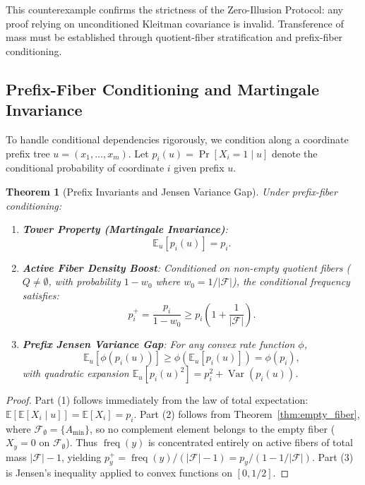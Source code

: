 \documentclass[11pt,a4paper]{article}
\theoremstyle{plain}
\newtheorem{theorem}{Theorem}[section]
\theoremstyle{definition}
\theoremstyle{remark}
\newcommand{\F}{\mathcal{F}}
\newcommand{\freq}{\operatorname{freq}}
\newcommand{\E}{\mathbb{E}}
\newcommand{\Var}{\operatorname{Var}}
\begin{document}
This counterexample confirms the strictness of the Zero-Illusion Protocol: any proof relying on unconditioned Kleitman covariance is invalid. Transference of mass must be established through quotient-fiber stratification and prefix-fiber conditioning.

\subsection{Prefix-Fiber Conditioning and Martingale Invariance}

To handle conditional dependencies rigorously, we condition along a coordinate prefix tree $u = (x_1, \dots, x_m)$. Let $p_i(u) = \Pr[X_i = 1 \mid u]$ denote the conditional probability of coordinate $i$ given prefix $u$.

\begin{theorem}[Prefix Invariants and Jensen Variance Gap]\label{thm:prefix_martingale}
Under prefix-fiber conditioning:
\begin{enumerate}
    \item \textbf{Tower Property (Martingale Invariance)}:
    \begin{equation}
    \E_{u}[p_i(u)] = p_i.
    \end{equation}
    \item \textbf{Active Fiber Density Boost}: Conditioned on non-empty quotient fibers ($Q \ne \emptyset$, with probability $1 - w_0$ where $w_0 = 1/|\F|$), the conditional frequency satisfies:
    \begin{equation}
    p_i^+ = \frac{p_i}{1 - w_0} \ge p_i \left(1 + \frac{1}{|\F|}\right).
    \end{equation}
    \item \textbf{Prefix Jensen Variance Gap}: For any convex rate function $\phi$,
    \begin{equation}
    \E_u[\phi(p_i(u))] \ge \phi(\E_u[p_i(u)]) = \phi(p_i),
    \end{equation}
    with quadratic expansion $\E_u[p_i(u)^2] = p_i^2 + \Var(p_i(u))$.
\end{enumerate}
\end{theorem}
\begin{proof}
Part (1) follows immediately from the law of total expectation: $\E[\E[X_i \mid u]] = \E[X_i] = p_i$. Part (2) follows from Theorem~\ref{thm:empty_fiber}, where $\F_\emptyset = \{A_{\min}\}$, so no complement element belongs to the empty fiber ($X_y = 0$ on $\F_\emptyset$). Thus $\freq(y)$ is concentrated entirely on active fibers of total mass $|\F| - 1$, yielding $p_y^+ = \freq(y)/(|\F|-1) = p_y / (1 - 1/|\F|)$. Part (3) is Jensen's inequality applied to convex functions on $[0, 1/2]$.
\end{proof}
\end{document}
